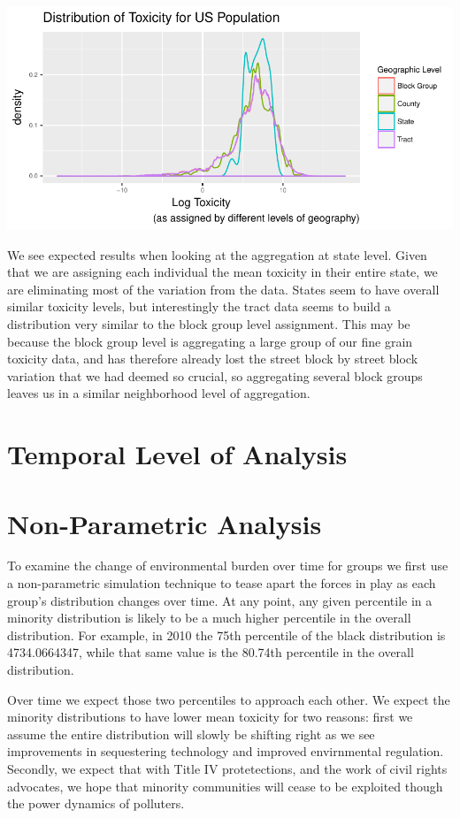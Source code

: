 \documentclass[12pt,twoside]{dukestatscithesis}
\theoremstyle{definition}
\theoremstyle{definition}
\theoremstyle{definition}
\theoremstyle{remark}
\begin{document}
\includegraphics{thesis_files/figure-latex/unnamed-chunk-1-1.pdf}

We see expected results when looking at the aggregation at state level.
Given that we are assigning each individual the mean toxicity in their
entire state, we are eliminating most of the variation from the data.
States seem to have overall similar toxicity levels, but interestingly
the tract data seems to build a distribution very similar to the block
group level assignment. This may be because the block group level is
aggregating a large group of our fine grain toxicity data, and has
therefore already lost the street block by street block variation that
we had deemed so crucial, so aggregating several block groups leaves us
in a similar neighborhood level of aggregation.

\section{Temporal Level of Analysis}\label{temporal-level-of-analysis}

\section{Non-Parametric Analysis}\label{non-parametric-analysis}

To examine the change of environmental burden over time for groups we
first use a non-parametric simulation technique to tease apart the
forces in play as each group's distribution changes over time. At any
point, any given percentile in a minority distribution is likely to be a
much higher percentile in the overall distribution. For example, in 2010
the 75th percentile of the black distribution is 4734.0664347, while
that same value is the 80.74th percentile in the overall distribution.

Over time we expect those two percentiles to approach each other. We
expect the minority distributions to have lower mean toxicity for two
reasons: first we assume the entire distribution will slowly be shifting
right as we see improvements in sequestering technology and improved
envirnmental regulation. Secondly, we expect that with Title IV
protetections, and the work of civil rights advocates, we hope that
minority communities will cease to be exploited though the power
dynamics of polluters.
\end{document}
